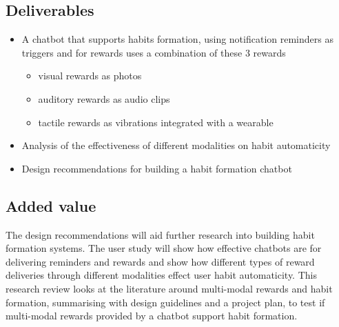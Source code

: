 \subsection*{Deliverables}
\begin{itemize}
  \item A chatbot that supports habits formation, using notification reminders as triggers and for rewards uses a combination of these 3 rewards
    \begin{itemize}
      \item visual rewards as photos
      \item auditory rewards as audio clips
      \item tactile rewards as vibrations integrated with a wearable
    \end{itemize}
  \item Analysis of the effectiveness of different modalities on habit automaticity
  \item Design recommendations for building a habit formation chatbot
\end{itemize}

\subsection*{Added value}
The design recommendations will aid further research into building habit formation systems. The user study will show how effective chatbots are for delivering reminders and rewards and show how different types of reward deliveries through different modalities effect user habit automaticity.\newline
\newline
This research review looks at the literature around multi-modal rewards and habit formation, summarising with design guidelines and a project plan, to test if multi-modal rewards provided by a chatbot support habit formation.

\newpage

